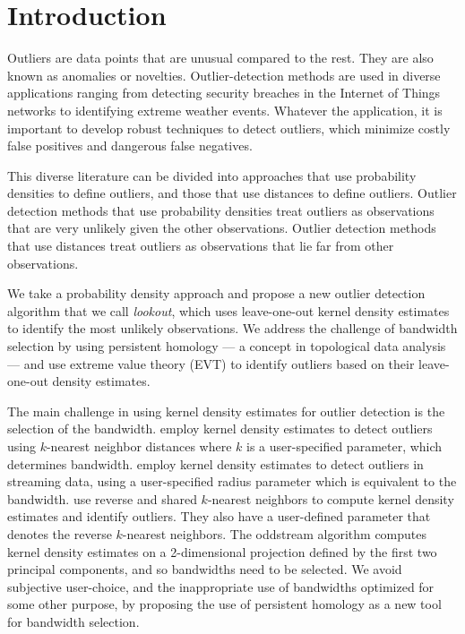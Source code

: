 \documentclass[12pt]{article}
\theoremstyle{definition}
\theoremstyle{definition}
\theoremstyle{definition}
\theoremstyle{definition}
\theoremstyle{remark}
\begin{document}
\hypertarget{introduction}{%
\section{Introduction}\label{introduction}}

Outliers are data points that are unusual compared to the rest. They are also known as anomalies or novelties. Outlier-detection methods are used in diverse applications ranging from detecting security breaches in the Internet of Things networks to identifying extreme weather events. Whatever the application, it is important to develop robust techniques to detect outliers, which minimize costly false positives and dangerous false negatives.

This diverse literature can be divided into approaches that use probability densities to define outliers, and those that use distances to define outliers. Outlier detection methods that use probability densities treat outliers as observations that are very unlikely given the other observations. Outlier detection methods that use distances treat outliers as observations that lie far from other observations.

We take a probability density approach and propose a new outlier detection algorithm that we call \emph{lookout}, which uses leave-one-out kernel density estimates to identify the most unlikely observations. We address the challenge of bandwidth selection by using persistent homology --- a concept in topological data analysis --- and use extreme value theory (EVT) to identify outliers based on their leave-one-out density estimates.

The main challenge in using kernel density estimates for outlier detection is the selection of the bandwidth. \citet{Schubert2014} employ kernel density estimates to detect outliers using \(k\)-nearest neighbor distances where \(k\) is a user-specified parameter, which determines bandwidth. \citet{Qin2019} employ kernel density estimates to detect outliers in streaming data, using a user-specified radius parameter which is equivalent to the bandwidth. \citet{Tang2017} use reverse and shared \(k\)-nearest neighbors to compute kernel density estimates and identify outliers. They also have a user-defined parameter that denotes the reverse \(k\)-nearest neighbors. The oddstream algorithm \citep{talagala2019anomaly} computes kernel density estimates on a 2-dimensional projection defined by the first two principal components, and so bandwidths need to be selected. We avoid subjective user-choice, and the inappropriate use of bandwidths optimized for some other purpose, by proposing the use of persistent homology as a new tool for bandwidth selection.
\end{document}
